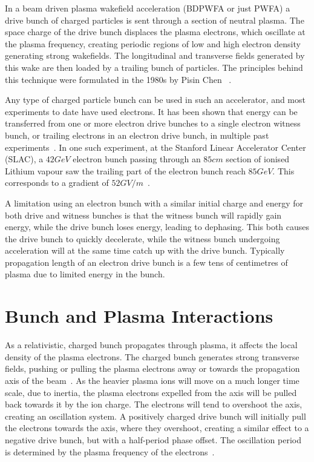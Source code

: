 In a beam driven plasma wakefield acceleration (BDPWFA or just PWFA) a drive bunch of charged particles is sent through a section of neutral plasma.
The space charge of the drive bunch displaces the plasma electrons, which oscillate at the plasma frequency, creating periodic regions of low and high electron density generating strong wakefields.
The longitudinal and transverse fields generated by this wake are then loaded by a trailing bunch of particles.
The principles behind this technique were formulated in the 1980s by Pisin Chen \etal~\cite{chen:1985}.

Any type of charged particle bunch can be used in such an accelerator, and most experiments to date have used electrons.
It has been shown that energy can be transferred from one or more electron drive bunches to a single electron witness bunch, or trailing electrons in an electron drive bunch, in multiple past experiments~\cite{rosenzweig:1988, blumenfeld:2007, kallos:2007, litos:2014, nakajima:1990}.
In one such experiment, at the Stanford Linear Accelerator Center (SLAC), a $42\unit{GeV}$ electron bunch passing through an $85\unit{cm}$ section of ionised Lithium vapour saw the trailing part of the electron bunch reach $85\unit{GeV}$.
This corresponds to a gradient of $52\unit{GV/m}$~\cite{blumenfeld:2007}.

A limitation using an electron bunch with a similar initial charge and energy for both drive and witness bunches is that the witness bunch will rapidly gain energy, while the drive bunch loses energy, leading to dephasing.
This both causes the drive bunch to quickly decelerate, while the witness bunch undergoing acceleration will at the same time catch up with the drive bunch.
Typically propagation length of an electron drive bunch is a few tens of centimetres of plasma due to limited energy in the bunch.

\section{Bunch and Plasma Interactions}
\label{Int:BPI}

As a relativistic, charged bunch propagates through plasma, it affects the local density of the plasma electrons.
The charged bunch generates strong transverse fields, pushing or pulling the plasma electrons away or towards the propagation axis of the beam~\cite{lee:2001,adli:2016b}.
As the heavier plasma ions will move on a much longer time scale, due to inertia, the plasma electrons expelled from the axis will be pulled back towards it by the ion charge.
The electrons will tend to overshoot the axis, creating an oscillation system.
A positively charged drive bunch will initially pull the electrons towards the axis, where they overshoot, creating a similar effect to a negative drive bunch, but with a half-period phase offset.
The oscillation period is determined by the plasma frequency of the electrons~\cite{hogan:2016,muggli:2017}. 

